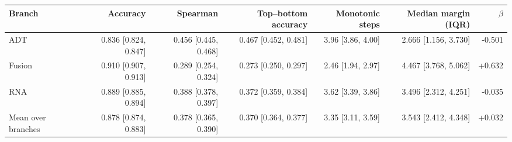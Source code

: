 \begin{tabular}{lrrrrrr}
\toprule
Branch & Accuracy & Spearman & Top--bottom accuracy & Monotonic steps & Median margin (IQR) & $\beta$ \\
\midrule
ADT & 0.836 [0.824, 0.847] & 0.456 [0.445, 0.468] & 0.467 [0.452, 0.481] & 3.96 [3.86, 4.00] & 2.666 [1.156, 3.730] & -0.501 \\
Fusion & 0.910 [0.907, 0.913] & 0.289 [0.254, 0.324] & 0.273 [0.250, 0.297] & 2.46 [1.94, 2.97] & 4.467 [3.768, 5.062] & +0.632 \\
RNA & 0.889 [0.885, 0.894] & 0.388 [0.378, 0.397] & 0.372 [0.359, 0.384] & 3.62 [3.39, 3.86] & 3.496 [2.312, 4.251] & -0.035 \\
Mean over branches & 0.878 [0.874, 0.883] & 0.378 [0.365, 0.390] & 0.370 [0.364, 0.377] & 3.35 [3.11, 3.59] & 3.543 [2.412, 4.348] & +0.032 \\
\bottomrule
\end{tabular}
